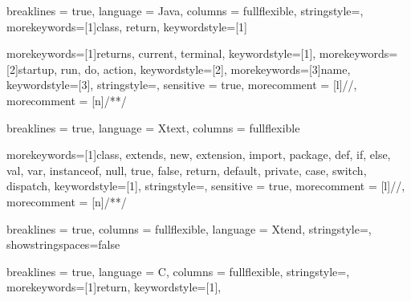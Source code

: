 
{
    breaklines = true,
    language = Java,
    columns = fullflexible,
    stringstyle=\color{eclipse_blue},
    morekeywords=[1]{class, return}, 
    keywordstyle=[1]\color{eclipse_red}
}

\newcommand{\javacodeinline}[1]{\lstinline[style = java, basicstyle = \ttfamily\normalsize]{#1}}

{
    morekeywords=[1]{returns, current, terminal}, 
    keywordstyle=[1]\color{DarkOrchid},
    morekeywords=[2]{startup, run, do, action},
    keywordstyle=[2]\color{eclipse_blue},
    morekeywords=[3]{name},
    keywordstyle=[3]\color{red},
    stringstyle=\color{Goldenrod},
    sensitive = true,
    morecomment = [l]{//},
    morecomment = [n]{/*}{*/}
}

{
  breaklines = true,
  language = Xtext,
  columns = fullflexible
}

\newcommand{\xtextinline}[1]{\lstinline[style = xtext, basicstyle = \ttfamily\normalsize]{#1}}

{
    morekeywords=[1]{class, extends, new, extension, import, package, def, if, else, val, var, instanceof, null, true, false, return, default, private, case, switch, dispatch}, 
    keywordstyle=[1]\color{DarkOrchid},
    stringstyle=\color{eclipse_blue},
    sensitive = true,
    morecomment = [l]{//},
    morecomment = [n]{/*}{*/}
}

{
    breaklines = true,
    columns = fullflexible,
    language = Xtend,
    stringstyle=\color{eclipse_blue},
    showstringspaces=false
}

\newcommand{\xtendinline}[1]{\lstinline[style = xtend, basicstyle = \ttfamily\normalsize]{#1}}


{
    breaklines = true,
    language = C,
    columns = fullflexible,
    stringstyle=\color{eclipse_blue},
    morekeywords=[1]{return}, 
    keywordstyle=[1]\color{eclipse_red},
}

\newcommand{\cinline}[1]{\lstinline[style = c, basicstyle = \ttfamily\normalsize]{#1}}

